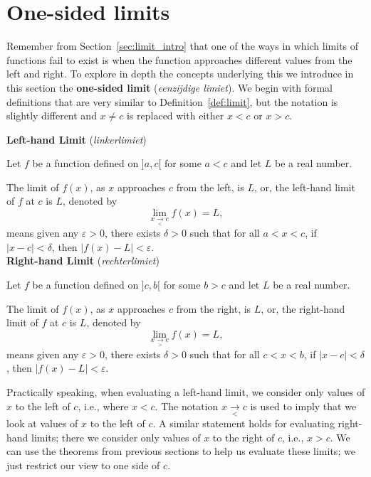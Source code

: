 \section{One-sided limits}\label{sec:limit_continuity}

Remember from Section~\ref{sec:limit_intro} that one of the ways in which limits of functions fail to exist is when the function approaches different values from the left and right. To explore in depth the concepts underlying this we introduce in this section  the \textbf{one-sided limit} (\textit{eenzijdige limiet}). We begin with formal definitions that are very similar to Definition~\ref{def:limit}, but the notation is slightly different and $x\neq c$ is replaced with either $x<c$ or $x>c$.

\begin{definition}\label{def:onesidedlimit}

\textbf{Left-hand Limit} (\textit{linkerlimiet}) 

Let $f$ be a function defined on $]a,c[$ for some $a<c$ and let $L$ be a real number. 

The limit of $f(x)$, as $x$ approaches $c$ from the left, is $L$, or, the left-hand limit of $f$ at $c$ is $L$, denoted by  
$$
\displaystyle \lim_{x\underset{<}{\rightarrow}c} f(x) = L,
$$
means  given any $\varepsilon > 0$, there exists $\delta > 0$ such that for all $a<x<c$,  if  $|x - c| < \delta$, then $|f(x) - L| < \varepsilon$.\\



\textbf{Right-hand Limit} (\textit{rechterlimiet})

Let $f$ be a function defined on $]c,b[$ for some $b>c$ and let $L$ be a real number. 

The limit of $f(x)$, as $x$ approaches $c$ from the right, is $L$, or, the right-hand limit of $f$ at $c$ is $L$, denoted by  
$$
\displaystyle \lim_{x\underset{>}{\rightarrow}c} f(x) = L,
$$
means  given any $\varepsilon > 0$, there exists $\delta > 0$ such that for all $c<x<b$,  
if  $|x - c| < \delta$, then $|f(x) - L| < \varepsilon$.
\end{definition}

Practically speaking, when evaluating a left-hand limit, we consider only values of $x$ to the left of $c$, i.e., where $x<c$. The  notation $x\underset{<}{\rightarrow}c$ is used to imply that we look at values of $x$ to the left of $c$.  A similar statement holds for evaluating right-hand limits; there we consider only values of $x$ to the right of $c$, i.e., $x>c$. We can use the theorems from previous sections to help us evaluate these limits; we just restrict our view to one side of $c$.

